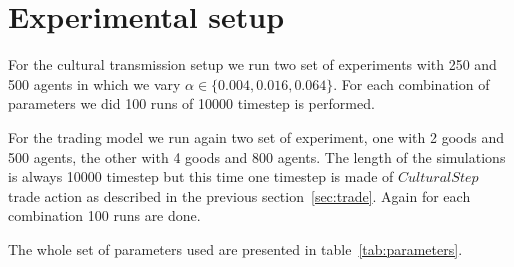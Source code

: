 \documentclass{wscpaperproc}
\begin{document}
\section{Experimental setup}
%

For the cultural transmission setup we run two set of experiments with 250 and 500 agents in which we vary $\alpha \in \{0.004,0.016,0.064\}$. For each combination of parameters we did 100 runs of 10000 timestep is performed. 

For the trading model we run  again two set of experiment, one with 2 goods and 500 agents, the other with 4 goods and 800 agents. The length of the simulations is always 10000 timestep but this time one timestep is made of $CulturalStep$ trade action as described in the previous section~\ref{sec:trade}. Again for each combination 100 runs are done.

The whole set of parameters used are presented in table~\ref{tab:parameters}. 
\end{document}
